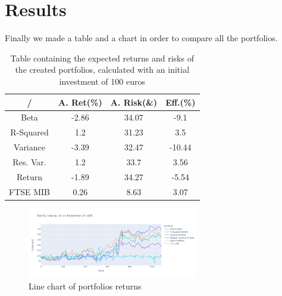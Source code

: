 \documentclass[12pt, a4paper, twocolumn]{article} %
\begin{document}
		
		
	\section{Results}
		Finally we made a table and a chart in order to compare all the portfolios.
	\begin{table}[H]
		\centering
		\caption{Table containing the expected returns and risks of the created portfolios, calculated with an initial investment of 100 euros}
		\begin{tabular}{cccc} %
			\hline
			/ & A. Ret(\%) & A. Risk(\&) & Eff.(\%)\\
			\hline
			Beta & -2.86 & 34.07 & -9.1\\
			R-Squared & 1.2 & 31.23 & 3.5\\
			Variance & -3.39 & 32.47 & -10.44\\
			Res. Var. & 1.2& 33.7 & 3.56\\
			Return & -1.89 & 34.27 & -5.54\\
			FTSE MIB &  0.26 & 8.63 & 3.07\\
		
			\hline
		\end{tabular}
	\end{table}

		\begin{figure}[H]
			\caption{Line chart of portfolios returns}
			\begin{center}
				\includegraphics[width=75mm,scale=1]{port_ret_complete_small.png}
			\end{center}
		\end{figure}
\end{document}
